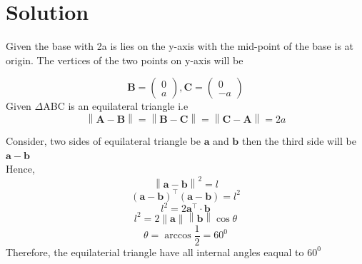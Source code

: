 \documentclass[journal,12pt,twocolumn]{IEEEtran}
\providecommand{\norm}[1]{\left\lVert#1\right\rVert}
\let\vec\mathbf
\providecommand{\brak}[1]{\ensuremath{\left(#1\right)}}
\begin{document}
\section{Solution}
\noindent Given the base with 2a is lies on the y-axis with the mid-point of the base is at origin. The vertices of the two points on y-axis will be

\begin{equation}
\vec{B}=\begin{pmatrix} 
0\\
a
\end{pmatrix}, {
\vec{C}=\begin{pmatrix} 
0\\
-a
\end{pmatrix} }
\end{equation}
\noindent Given $\Delta$ABC is an equilateral triangle i.e 
\begin{equation}
 \norm{\vec{A}-\vec{B}}= \norm{\vec{B}-\vec{C}}= \norm{\vec{C}-\vec{A}} =2a
\end{equation}

%
%

\noindent Consider, two sides of equilateral triangle be $\vec{a}$ and $\vec{b}$ then the third side will be $ \vec{a} -\vec{b}$ \\

Hence,
\begin{equation}
\norm{\vec{a}-\vec{b}}^2 = l
\end{equation}
\begin{equation}
\brak{\vec{a}-\vec{b}}^{\top} \brak{\vec{a}-\vec{b}} = l^2
\end{equation}
\begin{equation}
l^2 = 2 \vec{a}^{\top} \cdot \vec{b}
\end{equation}
\begin{equation}
l^2 = 2 \norm{\vec{a}}\norm{\vec{b}} \cos\theta
\end{equation}
\begin{equation}
\theta = \arccos\frac{1}{2} = 60^0
\end{equation}
\noindent Therefore, the equilaterial triangle have all internal angles eaqual to  $60^0$
\end{document}
